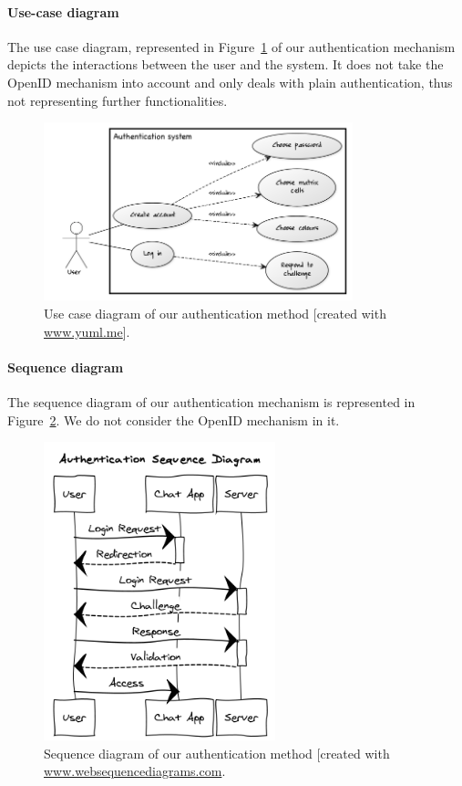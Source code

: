 \documentclass[11pt,a4paper]{article}
\begin{document}
\paragraph{Use-case diagram} The use case diagram, represented in Figure~\ref{fig:usecasedia} of our authentication mechanism depicts the interactions between the user and the system. It does not take the OpenID mechanism into account and only deals with plain authentication, thus not representing further functionalities.
\begin{figure}
\centering
\includegraphics[width=0.8\textwidth]{usecasedia.png}
\caption{Use case diagram of our authentication method [created with \url{www.yuml.me}].}
\label{fig:usecasedia}
\end{figure}


\paragraph{Sequence diagram} The sequence diagram of our authentication mechanism is represented in Figure~\ref{fig:seqdia}. We do not consider the OpenID mechanism in it.
\begin{figure}
\centering
\includegraphics[width=0.6\textwidth]{seqdia.png}
\caption{Sequence diagram of our authentication method [created with \url{www.websequencediagrams.com}.}
\label{fig:seqdia}
\end{figure}
\end{document}
